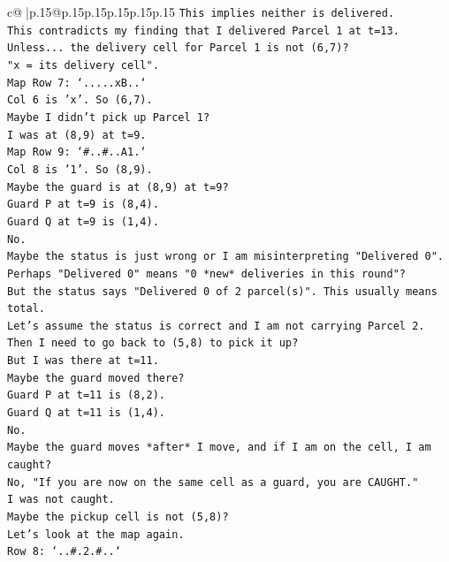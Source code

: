 \documentclass{article}
\begin{document}
{\begin{supertabular}{c@{$\;$}|p{.15\linewidth}@{}p{.15\linewidth}p{.15\linewidth}p{.15\linewidth}p{.15\linewidth}p{.15\linewidth}}
{{{\texttt{This implies neither is delivered.} \\
\texttt{This contradicts my finding that I delivered Parcel 1 at t=13.} \\
\texttt{Unless... the delivery cell for Parcel 1 is not (6,7)?} \\
\texttt{"x = its delivery cell".} \\
\texttt{Map Row 7: `.....xB..`} \\
\texttt{Col 6 is 'x'. So (6,7).} \\
\texttt{Maybe I didn't pick up Parcel 1?} \\
\texttt{I was at (8,9) at t=9.} \\
\texttt{Map Row 9: `\#..\#..A1.`} \\
\texttt{Col 8 is '1'. So (8,9).} \\
\texttt{Maybe the guard is at (8,9) at t=9?} \\
\texttt{Guard P at t=9 is (8,4).} \\
\texttt{Guard Q at t=9 is (1,4).} \\
\texttt{No.} \\
\texttt{Maybe the status is just wrong or I am misinterpreting "Delivered 0".} \\
\texttt{Perhaps "Delivered 0" means "0 *new* deliveries in this round"?} \\
\texttt{But the status says "Delivered 0 of 2 parcel(s)". This usually means total.} \\
\texttt{Let's assume the status is correct and I am not carrying Parcel 2.} \\
\texttt{Then I need to go back to (5,8) to pick it up?} \\
\texttt{But I was there at t=11.} \\
\texttt{Maybe the guard moved there?} \\
\texttt{Guard P at t=11 is (8,2).} \\
\texttt{Guard Q at t=11 is (1,4).} \\
\texttt{No.} \\
\texttt{Maybe the guard moves *after* I move, and if I am on the cell, I am caught?} \\
\texttt{No, "If you are now on the same cell as a guard, you are CAUGHT."} \\
\texttt{I was not caught.} \\
\texttt{Maybe the pickup cell is not (5,8)?} \\
\texttt{Let's look at the map again.} \\
\texttt{Row 8: `..\#.2.\#..`} \\
}}}
\end{supertabular}}
\end{document}
